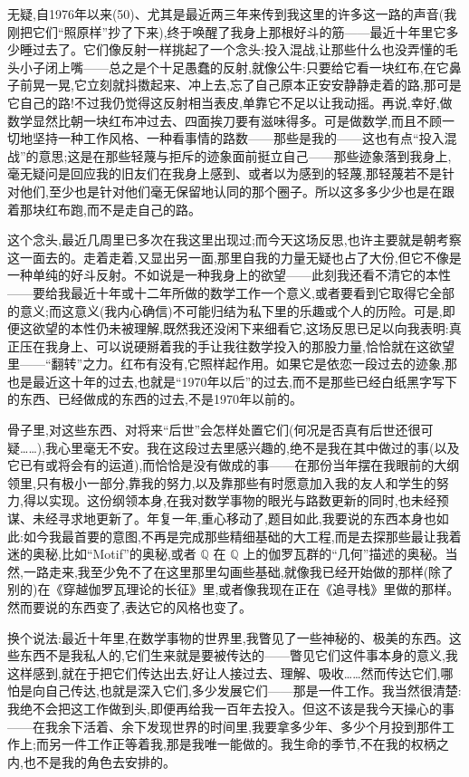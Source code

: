  无疑,自1976年以来(50)、尤其是最近两三年来传到我这里的许多这一路的声音(我刚把它们“照原样”抄了下来),终于唤醒了我身上那根好斗的筋——最近十年里它多少睡过去了。它们像反射一样挑起了一个念头:投入混战,让那些什么也没弄懂的毛头小子闭上嘴——总之是个十足愚蠢的反射,就像公牛:只要给它看一块红布,在它鼻子前晃一晃,它立刻就抖擞起来、冲上去,忘了自己原本正安安静静走着的路,那可是它自己的路!不过我仍觉得这反射相当表皮,单靠它不足以让我动摇。再说,幸好,做数学显然比朝一块红布冲过去、四面挨刀要有滋味得多。可是做数学,而且不顾一切地坚持一种工作风格、一种看事情的路数——那些是我的——这也有点“投入混战”的意思;这是在那些轻蔑与拒斥的迹象面前挺立自己——那些迹象落到我身上,毫无疑问是回应我的旧友们在我身上感到、或者以为感到的轻蔑,那轻蔑若不是针对他们,至少也是针对他们毫无保留地认同的那个圈子。所以这多多少少也是在跟着那块红布跑,而不是走自己的路。

 这个念头,最近几周里已多次在我这里出现过;而今天这场反思,也许主要就是朝考察这一面去的。走着走着,又显出另一面,那里自我的力量无疑也占了大份,但它不像是一种单纯的好斗反射。不如说是一种我身上的欲望——此刻我还看不清它的本性——要给我最近十年或十二年所做的数学工作一个意义,或者要看到它取得它全部的意义;而这意义(我内心确信)不可能归结为私下里的乐趣或个人的历险。可是,即便这欲望的本性仍未被理解,既然我还没闲下来细看它,这场反思已足以向我表明:真正压在我身上、可以说硬掰着我的手让我往数学投入的那股力量,恰恰就在这欲望里——“翻转”之力。红布有没有,它照样起作用。如果它是依恋一段过去的迹象,那也是最近这十年的过去,也就是“1970年以后”的过去,而不是那些已经白纸黑字写下的东西、已经做成的东西的过去,不是1970年以前的。

 骨子里,对这些东西、对将来“后世”会怎样处置它们(何况是否真有后世还很可疑……),我心里毫无不安。我在这段过去里感兴趣的,绝不是我在其中做过的事(以及它已有或将会有的运道),而恰恰是没有做成的事——在那份当年摆在我眼前的大纲领里,只有极小一部分,靠我的努力,以及靠那些有时愿意加入我的友人和学生的努力,得以实现。这份纲领本身,在我对数学事物的眼光与路数更新的同时,也未经预谋、未经寻求地更新了。年复一年,重心移动了,题目如此,我要说的东西本身也如此:如今我最首要的意图,不再是完成那些精细基础的大工程,而是去探那些最让我着迷的奥秘,比如“Motif”的奥秘,或者 $\mathbb{Q}$ 在 $\mathbb{Q}$ 上的伽罗瓦群的“几何”描述的奥秘。当然,一路走来,我至少免不了在这里那里勾画些基础,就像我已经开始做的那样(除了别的)在《穿越伽罗瓦理论的长征》里,或者像我现在正在《追寻栈》里做的那样。然而要说的东西变了,表达它的风格也变了。

换个说法:最近十年里,在数学事物的世界里,我瞥见了一些神秘的、极美的东西。这些东西不是我私人的,它们生来就是要被传达的——瞥见它们这件事本身的意义,我这样感到,就在于把它们传达出去,好让人接过去、理解、吸收……然而传达它们,哪怕是向自己传达,也就是深入它们,多少发展它们——那是一件工作。我当然很清楚:我绝不会把这工作做到头,即便再给我一百年去投入。但这不该是我今天操心的事——在我余下活着、余下发现世界的时间里,我要拿多少年、多少个月投到那件工作上;而另一件工作正等着我,那是我唯一能做的。我生命的季节,不在我的权柄之内,也不是我的角色去安排的。
